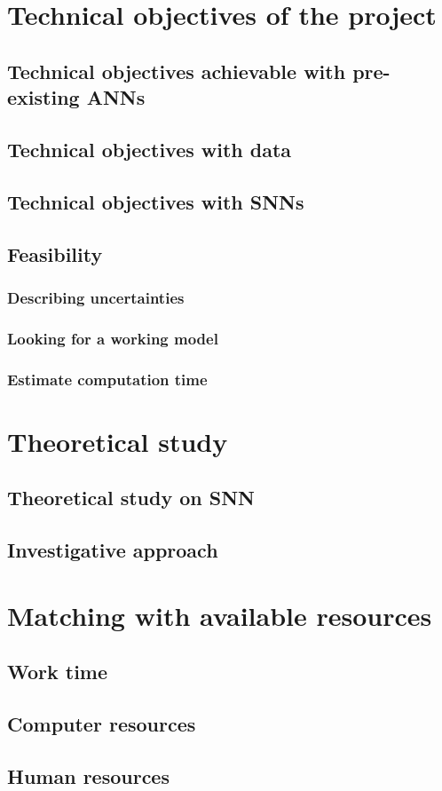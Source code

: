 \documentclass{article}
\begin{document}
\section{Technical objectives of the project}
        \subsection{Technical objectives achievable with pre-existing ANNs}
        \subsection{Technical objectives with data}
        \subsection{Technical objectives with SNNs}
        \subsection{Feasibility}
            \subsubsection{Describing uncertainties}
            \subsubsection{Looking for a working model}
            \subsubsection{Estimate computation time}
    
    \section{Theoretical study}
        \subsection{Theoretical study on SNN}
        \subsection{Investigative approach}
    
    \section{Matching with available resources}
        \subsection{Work time}
        \subsection{Computer resources}
        \subsection{Human resources}
\end{document}
